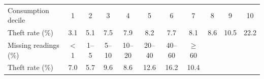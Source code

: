 \begin{tabular}{lcccccccccc}
\toprule
Consumption decile & 1 & 2 & 3 & 4 & 5 & 6 & 7 & 8 & 9 & 10 \\
Theft rate (\%) & 3.1 & 5.1 & 7.5 & 7.9 & 8.2 & 7.7 & 8.1 & 8.6 & 10.5 & 22.2 \\
\midrule
Missing readings (\%) & $<$1 & 1--5 & 5--10 & 10--20 & 20--40 & 40--60 & $\ge$60 &  &  &  \\
Theft rate (\%) & 7.0 & 5.7 & 9.6 & 8.6 & 12.6 & 16.2 & 10.4 &  &  &  \\
\bottomrule
\end{tabular}
